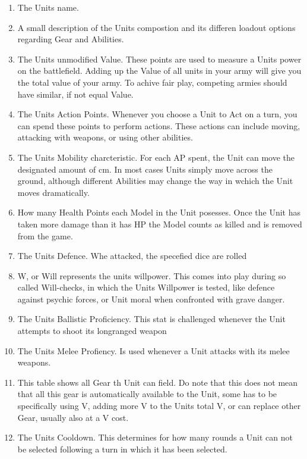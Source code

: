 \documentclass[a4paper,12pt]{book}
\begin{document}
\begin{adjustwidth}{-2cm}{-2cm}
\begin{multicols}{2}
\begin{enumerate}

	\item The Units name. 
	\item A small description of the Units compostion and its differen loadout options regarding Gear and Abilities.
	\item The Units unmodified Value. These points are used to measure a Units power on the battlefield. Adding up the Value of all units in your army will give you the total value of your army. To achive fair play, competing armies should have similar, if not equal Value.
	\item The Units Action Points. Whenever you choose a Unit to Act on a turn, you can spend these points to perform actions. These actions can include moving, attacking with weapons, or using other abilities.
	\item The Units Mobility charcteristic. For each AP spent, the Unit can move the designated amount of cm. In most cases Units simply move across the ground, although different Abilities may change the way in wchich the Unit moves dramatically.
	\item How many Health Points each Model in the Unit posesses. Once the Unit has taken more damage than it has HP the Model counts as killed and is removed from the game.
	\item The Units Defence. Whe attacked, the specefied dice are rolled
	\item W, or Will represents the units willpower. This comes into play during so called Will-checks, in which the Units Willpower is tested, like defence against psychic forces, or Unit moral when confronted with grave danger.
	\item The Units Ballistic Proficiency. This stat is challenged whenever the Unit attempts to shoot its longranged weapon
	\item The Units Melee Profiency. Is used whenever a Unit attacks with its melee weapons.
	\item This table shows all Gear th Unit can field. Do note that this does not mean that all this gear is automatically available to the Unit, some has to be specifically  using V, adding more V to the Units total V, or can replace other Gear, usually also at a V cost.
	\item The Units Cooldown. This determines for how many rounds a Unit can not be selected following a turn in which it has been selected.

\end{enumerate}
\end{multicols}
\end{adjustwidth}
\end{document}
